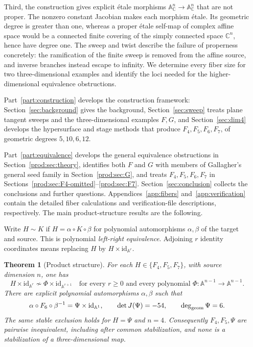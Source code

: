 \documentclass[11pt]{article}
\numberwithin{equation}{section}
\theoremstyle{plain}
\newtheorem{theorem}{Theorem}[section]
\theoremstyle{definition}
\theoremstyle{remark}
\newcommand{\C}{\mathbb{C}}
\newcommand{\A}{\mathbb{A}}
\newcommand{\id}{\mathrm{id}}
\begin{document}
Third, the construction gives explicit \'etale morphisms
$\A^n_{\C}\to\A^n_{\C}$ that are not proper. The nonzero constant Jacobian
makes each morphism \'etale. Its geometric degree is greater than one, whereas
a proper \'etale self-map of complex affine space would be a connected finite
covering of the simply connected space $\C^n$, hence have degree one.
The sweep and twist describe the failure of properness concretely: the
ramification of the finite sweep is removed from the affine source, and
inverse branches instead escape to infinity. We determine every fiber size
for two three-dimensional examples and identify the loci needed for the
higher-dimensional equivalence obstructions.

Part~\ref{part:construction} develops the construction framework:
Section~\ref{sec:background} gives the background,
Section~\ref{sec:sweep} treats plane tangent sweeps and the
three-dimensional examples $F,G$, and Section~\ref{sec:dim4} develops
the hypersurface and stage methods that produce $F_4,F_5,F_6,F_7$,
of geometric degrees $5,10,6,12$.

Part~\ref{part:equivalence} develops the general equivalence obstructions
in Section~\ref{prod:sec:theory}, identifies both $F$ and $G$ with members
of Gallagher's general seed family in Section~\ref{prod:sec:G}, and treats $F_4,F_5,F_6,F_7$
in Sections~\ref{prod:sec:F4-omitted}--\ref{prod:sec:F7}.
Section~\ref{sec:conclusion} collects the conclusions and further questions.
Appendices~\ref{app:fibers} and~\ref{app:verification} contain the detailed
fiber calculations and verification-file descriptions, respectively.
The main product-structure results are the following.

Write $H\sim K$ if $H=\alpha\circ K\circ\beta$ for polynomial
automorphisms $\alpha,\beta$ of the target and source. This is polynomial
\emph{left-right equivalence}. Adjoining $r$ identity coordinates means
replacing $H$ by $H\times\id_{\A^r}$.
\begin{theorem}[Product structure]\label{thm:product-summary}
For each $H\in\{F_4,F_5,F_7\}$, with source dimension $n$, one has
\[
 H\times\id_{\A^r}\nsim\Phi\times\id_{\A^{r+1}}
 \quad\text{for every }r\ge0
 \text{ and every polynomial }\Phi:\A^{n-1}\to\A^{n-1}.
\]
There are explicit polynomial automorphisms $\alpha,\beta$ such that
\[
 \alpha\circ F_6\circ\beta^{-1}=\Psi\times\id_{\A^1},
 \qquad \det J(\Psi)=-54,\qquad \deg_{\rm geom}\Psi=6.
\]
The same stable exclusion holds for $H=\Psi$ and $n=4$.
Consequently $F_4,F_5,\Psi$ are pairwise inequivalent, including after
common stabilization, and none is a stabilization of a three-dimensional map.
\end{theorem}
\end{document}
